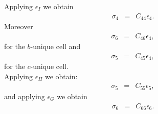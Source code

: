 \documentclass[12pt,a4paper]{article}
\begin{document}
Applying $\epsilon_I$ we obtain
\begin{eqnarray}
\sigma_4&=&C_{44} \epsilon_4.
\end{eqnarray}
Moreover
\begin{eqnarray}
\sigma_6&=&C_{46} \epsilon_4,
\end{eqnarray}
for the $b$-unique cell and
\begin{eqnarray}
\sigma_5&=&C_{45} \epsilon_4,
\end{eqnarray}
for the $c$-unique cell. \\
Applying $\epsilon_H$ we obtain:
\begin{eqnarray}
\sigma_5&=&C_{55} \epsilon_5,
\end{eqnarray}
and applying $\epsilon_G$ we obtain
\begin{eqnarray}
\sigma_6&=&C_{66} \epsilon_6.
\end{eqnarray}
\end{document}
